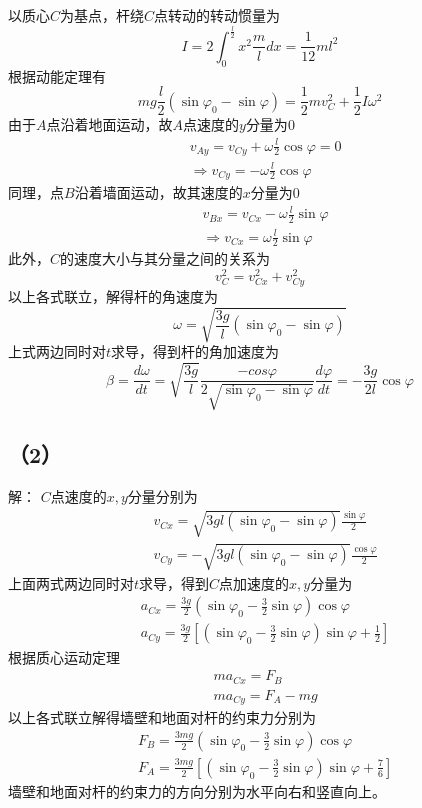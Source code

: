 \documentclass[10pt,a4paper]{article}
\theoremstyle{remark}
\begin{document}
以质心$C$为基点，杆绕$C$点转动的转动惯量为
\[
I = 2\int_0^{\frac{l}{2}}x^2\frac{m}{l}dx = \frac{1}{12}ml^2
\]
根据动能定理有
\[
mg\frac{l}{2}(\sin\varphi_0 - \sin\varphi) = \frac{1}{2}mv_C^2 + \frac{1}{2}I\omega^2
\]
由于$A$点沿着地面运动，故$A$点速度的$y$分量为$0$
\begin{align*}
&v_{Ay} = v_{Cy} + \omega\frac{l}{2}\cos\varphi = 0\\
&\Longrightarrow v_{Cy} = -\omega\frac{l}{2}\cos\varphi
\end{align*}
同理，点$B$沿着墙面运动，故其速度的$x$分量为$0$
\begin{align*}
&v_{Bx} = v_{Cx} - \omega\frac{l}{2}\sin\varphi\\
&\Longrightarrow v_{Cx} = \omega\frac{l}{2}\sin\varphi
\end{align*}
此外，$C$的速度大小与其分量之间的关系为
\[
v_C^2 = v_{Cx}^2 + v_{Cy}^2
\]
以上各式联立，解得杆的角速度为
\[
\omega = \sqrt{\frac{3g}{l}(\sin\varphi_0 - \sin\varphi)}
\]
上式两边同时对$t$求导，得到杆的角加速度为
\[
\beta = \frac{d\omega}{dt} = \sqrt{\frac{3g}{l}}\frac{-cos\varphi}{2\sqrt{\sin\varphi_0 - \sin\varphi}}\frac{d\varphi}{dt} = -\frac{3g}{2l}\cos\varphi
\]
\subsection*{（2）}解：
$C$点速度的$x,y$分量分别为
\begin{align*}
&v_{Cx} = \sqrt{3gl(\sin\varphi_0 - \sin\varphi)}\frac{\sin\varphi}{2}\\
&v_{Cy} = -\sqrt{3gl(\sin\varphi_0 - \sin\varphi)}\frac{\cos\varphi}{2}
\end{align*}
上面两式两边同时对$t$求导，得到$C$点加速度的$x,y$分量为
\begin{align*}
&a_{Cx} = \frac{3g}{2}(\sin\varphi_0 - \frac{3}{2}\sin\varphi)\cos\varphi\\
&a_{Cy} = \frac{3g}{2}[(\sin\varphi_0 - \frac{3}{2}\sin\varphi)\sin\varphi + \frac{1}{2}]
\end{align*}
根据质心运动定理
\begin{align*}
&ma_{Cx} = F_B\\
&ma_{Cy} = F_A - mg
\end{align*}
以上各式联立解得墙壁和地面对杆的约束力分别为
\begin{align*}
&F_B = \frac{3mg}{2}(\sin\varphi_0 - \frac{3}{2}\sin\varphi)\cos\varphi\\
&F_A = \frac{3mg}{2}[(\sin\varphi_0 - \frac{3}{2}\sin\varphi)\sin\varphi + \frac{7}{6}]
\end{align*}
墙壁和地面对杆的约束力的方向分别为水平向右和竖直向上。
\end{document}
